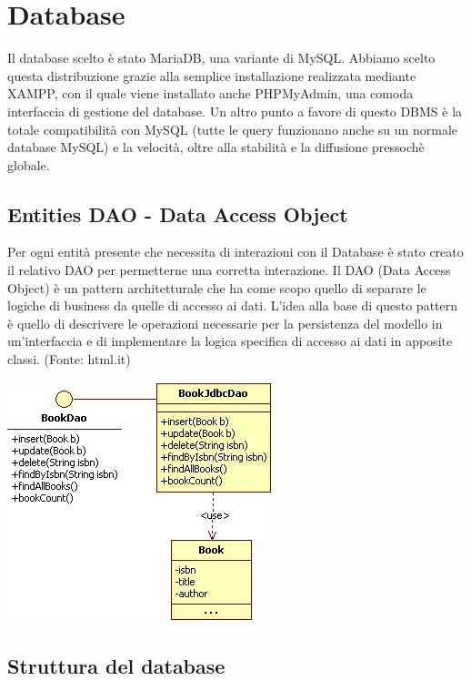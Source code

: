 \chapter{Database}

Il database scelto è stato MariaDB, una variante di MySQL. Abbiamo scelto questa distribuzione grazie alla semplice installazione realizzata mediante XAMPP, con il quale viene installato anche PHPMyAdmin, una comoda interfaccia di gestione del database. Un altro punto a favore di questo DBMS è la totale compatibilità con MySQL (tutte le query funzionano anche su un normale database MySQL) e la velocità, oltre alla stabilità e la diffusione pressochè globale.

\section{Entities DAO - Data Access Object}
Per ogni entità presente che necessita di interazioni con il Database è stato creato il relativo DAO per permetterne una corretta interazione. Il DAO (Data Access Object) è un pattern architetturale che ha come scopo quello di separare le logiche di business da quelle di accesso ai dati. L’idea alla base di questo pattern è quello di descrivere le operazioni necessarie per la persistenza del modello in un’interfaccia e di implementare la logica specifica di accesso ai dati in apposite classi. (Fonte: html.it)

\begin{center}
\includegraphics[width=0.3\linewidth]{img/dao}
\end{center}

\section{Struttura del database}

